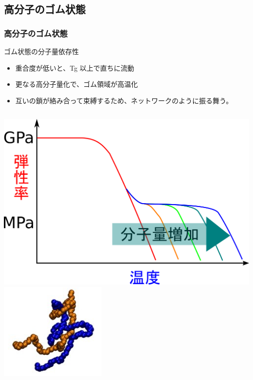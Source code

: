 \documentclass[12pt, dvipdfmx]{beamer}
\begin{document}
\subsection{高分子のゴム状態}
\begin{frame}
	\frametitle{高分子のゴム状態}
			\begin{exampleblock}{ゴム状態の分子量依存性}
				\begin{itemize}
					\item 重合度が低いと、Tg 以上で直ちに流動
					\item 更なる高分子量化で、ゴム領域が高温化
					\item 互いの鎖が絡み合って束縛するため、ネットワークのように振る舞う。
				\end{itemize}
			\end{exampleblock}
			\vspace{3mm}
			\begin{columns}[c, onlytextwidth]
					\centering
					\includegraphics[width=.9\textwidth]{polymer_spectrum_2.png}
				\centering
				\includegraphics[width=.8\textwidth]{karamiai.png}
			\end{columns}
\end{frame}
\end{document}
